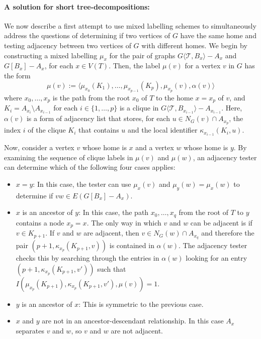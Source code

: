 \documentclass{patmorin}
\newcommand{\torso}[2]{{#1}\langle{#2}\rangle}
\begin{document}
\paragraph{A solution for short tree-decompositions:}
We now describe a first attempt to use mixed labelling schemes to simultaneously address the questions of determining if two vertices of $G$ have the same home and testing adjacency between two vertices of $G$ with different homes.  We begin by constructing a mixed labelling $\mu_x$ for the pair of graphs $\torso{G}{\mathcal{T},B_x}-A_x$ and $G[B_x]-A_x$, for each $x\in V(T)$.  Then, the label $\mu(v)$ for a vertex $v$ in $G$ has the form
\[
  \mu(v):=\langle \mu_{x_0}(K_1),\ldots,\mu_{x_{p-1}}(K_p),\mu_{x_p}(v),\alpha(v)\rangle
\]
where $x_0,\ldots,x_p$ is the path from the root $x_0$ of $T$ to the home $x=x_p$ of $v$, and $K_i=A_{x_i}\setminus A_{x_{i-1}}$ for each $i\in\{1,\ldots,p\}$ is a clique in $\torso{G}{\mathcal{T},B_{x_{i-1}}}-A_{x_{i-1}}$.  Here, $\alpha(v)$ is a form of adjacency list that stores, for each $u\in N_G(v)\cap A_{x_p}$, the index $i$ of the clique $K_i$ that contains $u$ and the local identifier $\kappa_{x_{i-1}}(K_i,u)$.

Now, consider a vertex $v$ whose home is $x$ and a vertex $w$ whose home is $y$.  By examining the sequence of clique labels in $\mu(v)$ and $\mu(w)$, an adjacency tester can determine which of the following four cases applies:
\begin{itemize}[nosep,nolistsep]
  \item $x=y$: In this case, the tester can use $\mu_x(v)$ and $\mu_y(w)=\mu_x(w)$ to determine if $vw\in E(G[B_x]-A_x)$.
  \item $x$ is an ancestor of $y$:  In this case, the path $x_0,\ldots,x_q$ from the root of $T$ to $y$ contains a node $x_p=x$.  The only way in which $v$ and $w$ can be adjacent is if $v\in K_{p+1}$.  If $v$ and $w$ are adjacent, then $v\in N_G(w)\cap A_{x_q}$ and therefore the pair $(p+1,\kappa_{x_p}(K_{p+1}, v))$ is contained in $\alpha(w)$. The adjacency tester checks this by searching through the entries in $\alpha(w)$ looking for an entry $(p+1,\kappa_{x_p}(K_{p+1}, v'))$ such that $I(\mu_{x_p}(K_{p+1}),\kappa_{x_p}(K_{p+1},v'),\mu(v))=1$.
  \item $y$ is an ancestor of $x$: This is symmetric to the previous case.
  \item $x$ and $y$ are not in an ancestor-descendant relationship.  In this case $A_x$ separates $v$ and $w$, so $v$ and $w$ are not adjacent.
\end{itemize}
\end{document}
